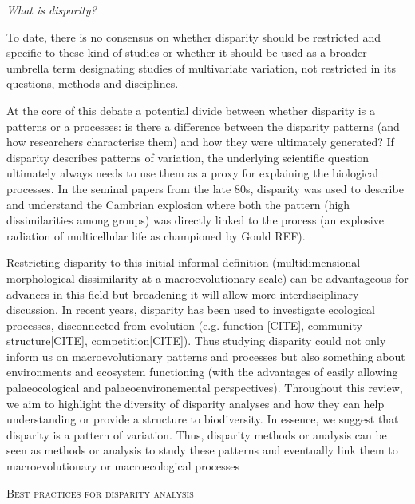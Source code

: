 \documentclass[12pt,letterpaper]{article}
\renewcommand{\section}[1]{%
\bigskip
\begin{center}
\begin{Large}
\normalfont\scshape #1
\medskip
\end{Large}
\end{center}}
\renewcommand{\subsection}[1]{%
\bigskip
\begin{center}
\begin{large}
\normalfont\itshape #1
\end{large}
\end{center}}
\begin{document}
\subsection{What \textit{is} disparity?}

To date, there is no consensus on whether disparity should be restricted and specific to these kind of studies or whether it should be used as a broader umbrella term designating studies of multivariate variation, not restricted in its questions, methods and disciplines.

At the core of this debate a potential divide between whether disparity is a patterns or a processes: is there a difference between the disparity patterns (and how researchers characterise them) and how they were ultimately generated?
If disparity describes patterns of variation, the underlying scientific question ultimately always needs to use them as a proxy for explaining the biological processes.
In the seminal papers from the late 80s, disparity was used to describe and understand the Cambrian explosion where both the pattern (high dissimilarities among groups) was directly linked to the process (an explosive radiation of multicellular life as championed by Gould REF).

Restricting disparity to this initial informal definition (multidimensional morphological dissimilarity at a macroevolutionary scale) can be advantageous for advances in this field but broadening it will allow more interdisciplinary discussion.
In recent years, disparity has been used to investigate ecological processes, disconnected from evolution (e.g. function [CITE], community structure[CITE], competition[CITE]).
Thus studying disparity could not only inform us on macroevolutionary patterns and processes but also something about environments and ecosystem functioning (with the advantages of easily allowing palaeocological and palaeoenvironemental perspectives).
Throughout this review, we aim to highlight the diversity of disparity analyses and how they can help understanding or provide a structure to biodiversity.
In essence, we suggest that disparity is a pattern of variation.
Thus, disparity methods or analysis can be seen as methods or analysis to study these patterns and eventually link them to macroevolutionary or macroecological processes

\section{Best practices for disparity analysis}
\end{document}
